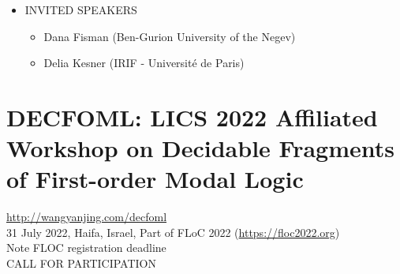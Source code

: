 \documentclass[prodmode,acmtecs]{acmsmall} %
\begin{document}
\begin{itemize}
\item  INVITED SPEAKERS 
 
\begin{itemize}\item  Dana Fisman (Ben-Gurion University of the Negev)
\item  Delia Kesner (IRIF - Université de Paris)
\end{itemize} 
\end{itemize}\section{DECFOML: LICS 2022 Affiliated Workshop on Decidable Fragments of First-order Modal Logic}\label{DECFOML}  \href{http://wangyanjing.com/decfoml}{http://wangyanjing.com/decfoml}\\ 
  31 July 2022, Haifa, Israel, Part of FLoC 2022 (\href{https://floc2022.org}{https://floc2022.org})\\ 
  Note FLOC registration deadline\\ 
CALL FOR PARTICIPATION 
\end{document}
